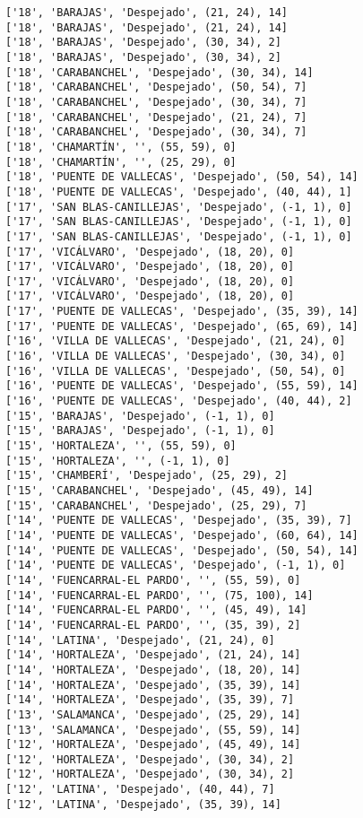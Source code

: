 \documentclass[11pt]{article}
\begin{document}
\begin{Verbatim}[commandchars=\\\{\}]
['18', 'BARAJAS', 'Despejado', (21, 24), 14]
['18', 'BARAJAS', 'Despejado', (21, 24), 14]
['18', 'BARAJAS', 'Despejado', (30, 34), 2]
['18', 'BARAJAS', 'Despejado', (30, 34), 2]
['18', 'CARABANCHEL', 'Despejado', (30, 34), 14]
['18', 'CARABANCHEL', 'Despejado', (50, 54), 7]
['18', 'CARABANCHEL', 'Despejado', (30, 34), 7]
['18', 'CARABANCHEL', 'Despejado', (21, 24), 7]
['18', 'CARABANCHEL', 'Despejado', (30, 34), 7]
['18', 'CHAMARTÍN', '', (55, 59), 0]
['18', 'CHAMARTÍN', '', (25, 29), 0]
['18', 'PUENTE DE VALLECAS', 'Despejado', (50, 54), 14]
['18', 'PUENTE DE VALLECAS', 'Despejado', (40, 44), 1]
['17', 'SAN BLAS-CANILLEJAS', 'Despejado', (-1, 1), 0]
['17', 'SAN BLAS-CANILLEJAS', 'Despejado', (-1, 1), 0]
['17', 'SAN BLAS-CANILLEJAS', 'Despejado', (-1, 1), 0]
['17', 'VICÁLVARO', 'Despejado', (18, 20), 0]
['17', 'VICÁLVARO', 'Despejado', (18, 20), 0]
['17', 'VICÁLVARO', 'Despejado', (18, 20), 0]
['17', 'VICÁLVARO', 'Despejado', (18, 20), 0]
['17', 'PUENTE DE VALLECAS', 'Despejado', (35, 39), 14]
['17', 'PUENTE DE VALLECAS', 'Despejado', (65, 69), 14]
['16', 'VILLA DE VALLECAS', 'Despejado', (21, 24), 0]
['16', 'VILLA DE VALLECAS', 'Despejado', (30, 34), 0]
['16', 'VILLA DE VALLECAS', 'Despejado', (50, 54), 0]
['16', 'PUENTE DE VALLECAS', 'Despejado', (55, 59), 14]
['16', 'PUENTE DE VALLECAS', 'Despejado', (40, 44), 2]
['15', 'BARAJAS', 'Despejado', (-1, 1), 0]
['15', 'BARAJAS', 'Despejado', (-1, 1), 0]
['15', 'HORTALEZA', '', (55, 59), 0]
['15', 'HORTALEZA', '', (-1, 1), 0]
['15', 'CHAMBERÍ', 'Despejado', (25, 29), 2]
['15', 'CARABANCHEL', 'Despejado', (45, 49), 14]
['15', 'CARABANCHEL', 'Despejado', (25, 29), 7]
['14', 'PUENTE DE VALLECAS', 'Despejado', (35, 39), 7]
['14', 'PUENTE DE VALLECAS', 'Despejado', (60, 64), 14]
['14', 'PUENTE DE VALLECAS', 'Despejado', (50, 54), 14]
['14', 'PUENTE DE VALLECAS', 'Despejado', (-1, 1), 0]
['14', 'FUENCARRAL-EL PARDO', '', (55, 59), 0]
['14', 'FUENCARRAL-EL PARDO', '', (75, 100), 14]
['14', 'FUENCARRAL-EL PARDO', '', (45, 49), 14]
['14', 'FUENCARRAL-EL PARDO', '', (35, 39), 2]
['14', 'LATINA', 'Despejado', (21, 24), 0]
['14', 'HORTALEZA', 'Despejado', (21, 24), 14]
['14', 'HORTALEZA', 'Despejado', (18, 20), 14]
['14', 'HORTALEZA', 'Despejado', (35, 39), 14]
['14', 'HORTALEZA', 'Despejado', (35, 39), 7]
['13', 'SALAMANCA', 'Despejado', (25, 29), 14]
['13', 'SALAMANCA', 'Despejado', (55, 59), 14]
['12', 'HORTALEZA', 'Despejado', (45, 49), 14]
['12', 'HORTALEZA', 'Despejado', (30, 34), 2]
['12', 'HORTALEZA', 'Despejado', (30, 34), 2]
['12', 'LATINA', 'Despejado', (40, 44), 7]
['12', 'LATINA', 'Despejado', (35, 39), 14]

\end{Verbatim}
\end{document}

